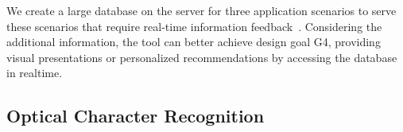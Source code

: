 We create a large database on the server for
three application scenarios to serve these scenarios that
require real-time information feedback~\cite{Mcauley2015, He2016}.
Considering the additional information, the tool can better achieve design goal G4,
providing visual presentations or personalized recommendations by accessing the database in realtime.





\subsection{Optical Character Recognition}


